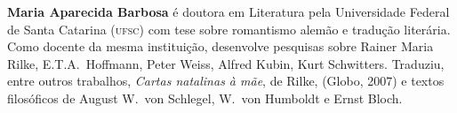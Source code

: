 \textbf{Maria Aparecida Barbosa} é doutora em Literatura pela Universidade
Federal de Santa Catarina (\textsc{ufsc}) com tese sobre romantismo alemão e tradução 
literária. Como docente da mesma instituição, desenvolve pesquisas sobre Rainer 
Maria Rilke, E.T.A.~Hoffmann, Peter Weiss, Alfred Kubin, Kurt Schwitters. 
Traduziu, entre outros trabalhos, \textit{Cartas natalinas à mãe}, de Rilke, (Globo, 2007) 
e textos filosóficos de August W.~von Schlegel, W.~von Humboldt e Ernst Bloch.


